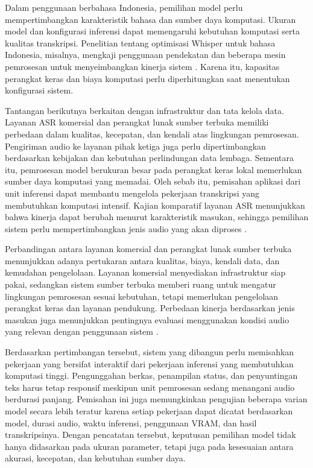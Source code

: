 Dalam penggunaan berbahasa Indonesia, pemilihan model perlu mempertimbangkan karakteristik bahasa dan sumber daya komputasi. Ukuran model dan konfigurasi inferensi dapat memengaruhi kebutuhan komputasi serta kualitas transkripsi. Penelitian tentang optimisasi Whisper untuk bahasa Indonesia, misalnya, mengkaji penggunaan pendekatan  dan beberapa mesin pemrosesan untuk menyeimbangkan kinerja sistem . Karena itu, kapasitas perangkat keras dan biaya komputasi perlu diperhitungkan saat menentukan konfigurasi sistem.

Tantangan berikutnya berkaitan dengan infrastruktur dan tata kelola data. Layanan ASR komersial dan perangkat lunak sumber terbuka memiliki perbedaan dalam kualitas, kecepatan, dan kendali atas lingkungan pemrosesan. Pengiriman audio ke layanan pihak ketiga juga perlu dipertimbangkan berdasarkan kebijakan dan kebutuhan perlindungan data lembaga. Sementara itu, pemrosesan model berukuran besar pada perangkat keras lokal memerlukan sumber daya komputasi yang memadai. Oleh sebab itu, pemisahan aplikasi  dari unit inferensi dapat membantu mengelola pekerjaan transkripsi yang membutuhkan komputasi intensif. Kajian komparatif layanan ASR menunjukkan bahwa kinerja dapat berubah menurut karakteristik masukan, sehingga pemilihan sistem perlu mempertimbangkan jenis audio yang akan diproses .

Perbandingan antara layanan komersial dan perangkat lunak sumber terbuka menunjukkan adanya pertukaran antara kualitas, biaya, kendali data, dan kemudahan pengelolaan. Layanan komersial menyediakan infrastruktur siap pakai, sedangkan sistem sumber terbuka memberi ruang untuk mengatur lingkungan pemrosesan sesuai kebutuhan, tetapi memerlukan pengelolaan perangkat keras dan layanan pendukung. Perbedaan kinerja berdasarkan jenis masukan juga menunjukkan pentingnya evaluasi menggunakan kondisi audio yang relevan dengan penggunaan sistem .

Berdasarkan pertimbangan tersebut, sistem yang dibangun perlu memisahkan pekerjaan yang bersifat interaktif dari pekerjaan inferensi yang membutuhkan komputasi tinggi. Pengunggahan berkas, penampilan status, dan penyuntingan teks harus tetap responsif meskipun unit pemrosesan sedang menangani audio berdurasi panjang. Pemisahan ini juga memungkinkan pengujian beberapa varian model secara lebih teratur karena setiap pekerjaan dapat dicatat berdasarkan model, durasi audio, waktu inferensi, penggunaan VRAM, dan hasil transkripsinya. Dengan pencatatan tersebut, keputusan pemilihan model tidak hanya didasarkan pada ukuran parameter, tetapi juga pada kesesuaian antara akurasi, kecepatan, dan kebutuhan sumber daya.

